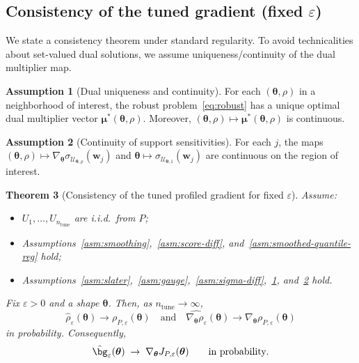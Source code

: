 \documentclass[11pt]{article}
\newcommand{\cU}{\mathcal{U}}
\newcommand{\btheta}{\bm{\theta}}
\newcommand{\bw}{\bm{w}}
\newcommand{\bmu}{\bm{\mu}}
\theoremstyle{plain}
\newtheorem{theorem}{Theorem}
\theoremstyle{definition}
\newtheorem{assumption}[theorem]{Assumption}
\begin{document}
\subsection{Consistency of the tuned gradient (fixed $\varepsilon$)}

We state a consistency theorem under standard regularity.
To avoid technicalities about set-valued dual solutions, we assume uniqueness/continuity of the dual multiplier map.

\begin{assumption}[Dual uniqueness and continuity]\label{asm:dual-unique}
For each $(\btheta,\rho)$ in a neighborhood of interest, the robust problem~\eqref{eq:robust} has a unique optimal dual multiplier vector $\bmu^*(\btheta,\rho)$.
Moreover, $(\btheta,\rho)\mapsto \bmu^*(\btheta,\rho)$ is continuous.
\end{assumption}

\begin{assumption}[Continuity of support sensitivities]\label{asm:sensitivity-cont}
For each $j$, the maps $(\btheta,\rho)\mapsto \nabla_{\btheta}\sigma_{\cU_{\btheta,\rho}}(\bw_j)$ and $\btheta\mapsto \sigma_{\cU_{\btheta,1}}(\bw_j)$
are continuous on the region of interest.
\end{assumption}

\begin{theorem}[Consistency of the tuned profiled gradient for fixed $\varepsilon$]\label{thm:consistency-eps}
Assume:
\begin{itemize}[leftmargin=2em, itemsep=1pt]
\item $U_1,\dots,U_{n_{\mathrm{tune}}}$ are i.i.d.\ from $P$;
\item Assumptions~\ref{asm:smoothing},~\ref{asm:score-diff}, and~\ref{asm:smoothed-quantile-reg} hold;
\item Assumptions~\ref{asm:slater},~\ref{asm:gauge},~\ref{asm:sigma-diff},~\ref{asm:dual-unique}, and~\ref{asm:sensitivity-cont} hold.
\end{itemize}
Fix $\varepsilon>0$ and a shape $\btheta$.
Then, as $n_{\mathrm{tune}}\to\infty$,
\[
\hat\rho_{\varepsilon}(\btheta)\to \rho_{P,\varepsilon}(\btheta)
\quad\text{and}\quad
\widehat{\nabla_{\btheta}\rho_{\varepsilon}}(\btheta)\to \nabla_{\btheta}\rho_{P,\varepsilon}(\btheta)
\]
in probability.
Consequently,
\begin{equation}\label{eq:consistency-ghat}
\hat{\bg}_{\varepsilon}(\btheta)\;\to\;\nabla_{\btheta}J_{P,\varepsilon}(\btheta)
\qquad \text{in probability}.
\end{equation}
\end{theorem}
\end{document}
